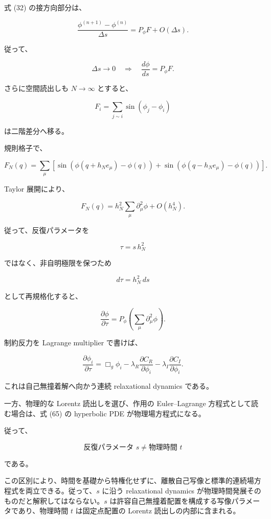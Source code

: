 \documentclass[
  a4paper,
]{ltjsarticle}
\begin{document}
式 (32) の接方向部分は、

\[
\frac{
\phi^{(n+1)}-\phi^{(n)}
}{
\Delta s
}
=
P_\phi F
+
O(\Delta s).
\]

従って、

\[
\boxed{
\Delta s\to0
\quad\Longrightarrow\quad
\frac{d\phi}{ds}
=
P_\phi F.
}
\tag{67}
\]

さらに空間読出しも \(N\to\infty\) とすると、

\[
F_i
=
\sum_{j\sim i}
\sin(\phi_j-\phi_i)
\]

は二階差分へ移る。

規則格子で、

\[
F_N(q)
=
\sum_\mu
\left[
\sin(\phi(q+h_Ne_\mu)-\phi(q))
+
\sin(\phi(q-h_Ne_\mu)-\phi(q))
\right].
\tag{68}
\]

Taylor 展開により、

\[
\boxed{
F_N(q)
=
h_N^2
\sum_\mu
\partial_\mu^2\phi
+
O(h_N^4).
}
\tag{69}
\]

従って、反復パラメータを

\[
\tau
=
s\,h_N^2
\]

ではなく、非自明極限を保つため

\[
d\tau
=
h_N^2\,ds
\]

として再規格化すると、

\[
\boxed{
\frac{\partial\phi}{\partial\tau}
=
P_\phi
\left(
\sum_\mu
\partial_\mu^2\phi
\right).
}
\tag{70}
\]

制約反力を Lagrange multiplier で書けば、

\[
\boxed{
\frac{\partial\phi_i}{\partial\tau}
=
\Box_g\phi_i
-
\lambda_R\frac{\partial C_R}{\partial\phi_i}
-
\lambda_I\frac{\partial C_I}{\partial\phi_i}.
}
\tag{71}
\]

これは自己無撞着解へ向かう連続 relaxational dynamics である。

一方、物理的な Lorentz 読出しを選び、作用の Euler--Lagrange
方程式として読む場合は、式 (65) の hyperbolic PDE が物理場方程式になる。

従って、

\[
\boxed{
\text{反復パラメータ }s
\neq
\text{物理時間 }t
}
\tag{72}
\]

である。

この区別により、時間を基礎から特権化せずに、離散自己写像と標準的連続場方程式を両立できる。従って、\(s\)
に沿う relaxational dynamics
が物理時間発展そのものだと解釈してはならない。\(s\)
は許容自己無撞着配置を構成する写像パラメータであり、物理時間 \(t\)
は固定点配置の Lorentz 読出しの内部に含まれる。
\end{document}
